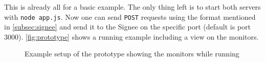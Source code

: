 This is already all for a basic example. The only thing left is to start both servers with \texttt{node app.js}. Now one can send \texttt{POST} requests using the format mentioned in \autoref{subsec:signee} and send it to the Signee on the specific port (default is port $3000$). \autoref{fig:prototype} shows a running example including a view on the monitors.

\begin{figure}
\centering
\caption{Example setup of the prototype showing the monitors while running}
\label{fig:prototype}
\end{figure}







